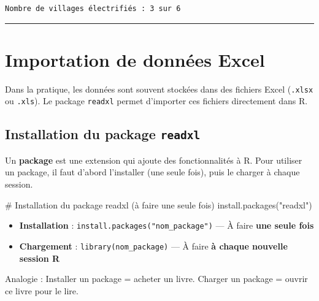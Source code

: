 \documentclass[
  french,
  11pt,
  a4paper,
]{article}
\newenvironment{Shaded}{}{}
\newcommand{\CommentTok}[1]{\textcolor[rgb]{0.42,0.45,0.49}{#1}}
\newcommand{\FunctionTok}[1]{\textcolor[rgb]{0.44,0.26,0.76}{#1}}
\newcommand{\NormalTok}[1]{\textcolor[rgb]{0.14,0.16,0.18}{#1}}
\newcommand{\StringTok}[1]{\textcolor[rgb]{0.01,0.18,0.38}{#1}}
\providecommand{\tightlist}{%
  \setlength{\itemsep}{0pt}\setlength{\parskip}{0pt}}
\begin{document}
\begin{verbatim}
Nombre de villages électrifiés : 3 sur 6 
\end{verbatim}

\begin{center}\rule{0.5\linewidth}{0.5pt}\end{center}

\section{Importation de données
Excel}\label{importation-de-donnuxe9es-excel}

Dans la pratique, les données sont souvent stockées dans des fichiers
Excel (\texttt{.xlsx} ou \texttt{.xls}). Le package \texttt{readxl}
permet d'importer ces fichiers directement dans R.

\subsection{\texorpdfstring{Installation du package
\texttt{readxl}}{Installation du package readxl}}\label{installation-du-package-readxl}

Un \textbf{package} est une extension qui ajoute des fonctionnalités à
R. Pour utiliser un package, il faut d'abord l'installer (une seule
fois), puis le charger à chaque session.

\begin{Shaded}
\begin{Highlighting}[]
\CommentTok{\# Installation du package readxl (à faire une seule fois)}
\FunctionTok{install.packages}\NormalTok{(}\StringTok{"readxl"}\NormalTok{)}
\end{Highlighting}
\end{Shaded}

\begin{tcolorbox}[enhanced jigsaw, arc=.35mm, bottomrule=.15mm, bottomtitle=1mm, breakable, colback=white, colbacktitle=quarto-callout-important-color!10!white, colframe=quarto-callout-important-color-frame, coltitle=black, left=2mm, leftrule=.75mm, opacityback=0, opacitybacktitle=0.6, rightrule=.15mm, title=\textcolor{quarto-callout-important-color}{\faExclamation}\hspace{0.5em}{À retenir --- Installation vs Chargement d'un package}, titlerule=0mm, toprule=.15mm, toptitle=1mm]

\begin{itemize}
\tightlist
\item
  \textbf{Installation} : \texttt{install.packages("nom\_package")} ---
  À faire \textbf{une seule fois}
\item
  \textbf{Chargement} : \texttt{library(nom\_package)} --- À faire
  \textbf{à chaque nouvelle session R}
\end{itemize}

Analogie : Installer un package = acheter un livre. Charger un package =
ouvrir ce livre pour le lire.

\end{tcolorbox}
\end{document}
